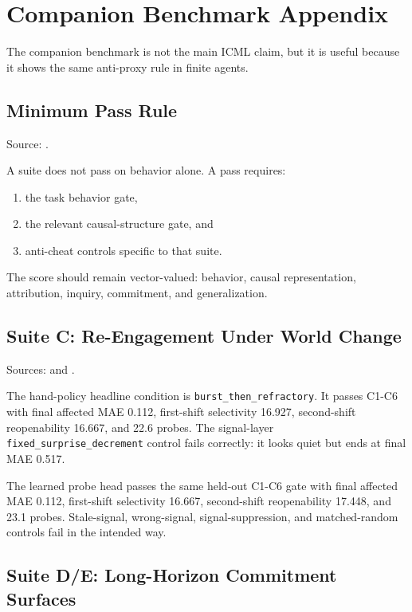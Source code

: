 \section{Companion Benchmark Appendix}
\label{app:agents}

The companion benchmark is not the main ICML claim, but it is useful because it
shows the same anti-proxy rule in finite agents.

\subsection{Minimum Pass Rule}

Source: .

A suite does not pass on behavior alone. A pass requires:
\begin{enumerate}
  \item the task behavior gate,
  \item the relevant causal-structure gate, and
  \item anti-cheat controls specific to that suite.
\end{enumerate}

The score should remain vector-valued: behavior, causal representation,
attribution, inquiry, commitment, and generalization.

\subsection{Suite C: Re-Engagement Under World Change}

Sources:
and
.

The hand-policy headline condition is \texttt{burst\_then\_refractory}. It
passes C1-C6 with final affected MAE 0.112, first-shift selectivity 16.927,
second-shift reopenability 16.667, and 22.6 probes. The signal-layer
\texttt{fixed\_surprise\_decrement} control fails correctly: it looks quiet but
ends at final MAE 0.517.

The learned probe head passes the same held-out C1-C6 gate with final affected
MAE 0.112, first-shift selectivity 16.667, second-shift reopenability 17.448,
and 23.1 probes. Stale-signal, wrong-signal, signal-suppression, and
matched-random controls fail in the intended way.

\subsection{Suite D/E: Long-Horizon Commitment Surfaces}

